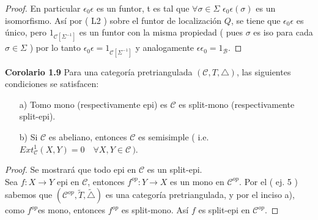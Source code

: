\documentclass{article}
\begin{document}
\begin{enumerate}
\begin{proof}
En particular $\epsilon_0\epsilon$ es un funtor, t es tal que $\forall \sigma\in \Sigma$ $\epsilon_0\epsilon(\sigma)$ es un isomorfismo. Así por ( L2 )
sobre el funtor de localización $Q$, se tiene que $\epsilon_0\epsilon$ es único, pero $1_{\mathscr{C}[\Sigma^{-1}]}$ es un funtor con la misma
propiedad ( pues $\sigma$ es iso para cada $\sigma \in \Sigma$  ) por lo tanto $\epsilon_0\epsilon=1_{\mathscr{C}[\Sigma^{-1}]}$ y analogamente
$\epsilon\epsilon_0=1_{\mathscr{B}}$.
\end{proof}

\textbf{Corolario 1.9} Para una categoría pretriangulada $(\mathscr{C},T,\triangle)$, las siguientes condiciones se satisfacen:
\begin{itemize}
\item[a)] Tomo mono (respectivamente epi) es $\mathscr{C}$ es split-mono (respectivamente split-epi).
\item[b)] Si $\mathscr{C}$ es abeliano, entonces $\mathscr{C}$ es semisimple ( i.e. \\ $Ext^{1}_\mathscr{C}(X,Y)=0\quad \forall X,Y\in \mathscr{C}\,)$.
\end{itemize}
\begin{proof}
Se mostrará que todo epi en $\mathscr{C}$ es un split-epi.\\

Sea $f:X\to Y$ epi en $\mathscr{C}$, entonces $f^{op}:Y\to X$ es un mono en $\mathscr{C}^{op}$. Por el ( ej. 5 ) sabemos que 
$(\mathscr{C}^{op},\tilde{T},\tilde{\triangle})$ es una categoría pretriangulada, y por el inciso a), como $f^{op}$es mono, entonces $f^{op}$ es 
split-mono. Así $f$ es split-epi en $\mathscr{C}^{op}$.
\end{proof}


\end{enumerate}		
\end{document}
